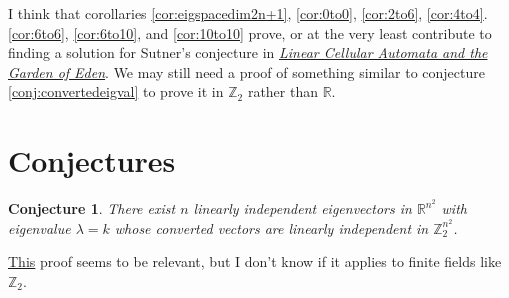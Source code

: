 \documentclass[12pt]{article}
\newtheorem{conjecture}{Conjecture}
\newcommand{\Z}{\mathbb{Z}}
\newcommand{\R}{\mathbb{R}}
\begin{document}
	
	I think that corollaries \ref{cor:eigspacedim2n+1}, \ref{cor:0to0},
	\ref{cor:2to6}, \ref{cor:4to4}. \ref{cor:6to6}, \ref{cor:6to10}, and
	\ref{cor:10to10} prove, or at the very least contribute to finding a solution
	for Sutner's conjecture in
	\href{https://drive.google.com/open?id=1b7mSpPkASXAFlvrFL6rWC7dB7qN_-VWf}{\textit{Linear
			Cellular Automata and the Garden of Eden}}.
	We may still need a proof of something similar to conjecture
	\ref{conj:convertedeigval} to prove it in $\Z_2$ rather than $\R$. 
	
	\section{Conjectures}
	\begin{conjecture}\label{conj:convertedli}
		There exist $n$ linearly independent eigenvectors in $\R^{n^2}$ with
		eigenvalue $\lambda = k$ whose converted vectors are linearly independent in
		$\Z_2^{n^2}$.
	\end{conjecture}
	\href{http://www.quandt.com/papers/basicmatrixtheorems.pdf}{This} proof seems
	to be relevant, but I don't know if it applies to finite fields like $\Z_2$.
	
\end{document}
